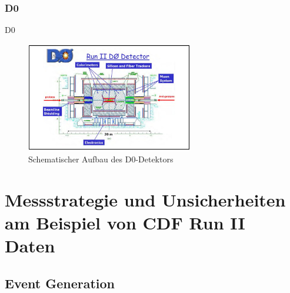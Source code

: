 \documentclass[aspectratio=1610, 9pt]{beamer}
\begin{document}
\subsubsection{D0}

\begin{frame}{D0}
  \begin{figure}
    \includegraphics[width=0.65\textwidth]{images/d0.jpg}
    \caption{Schematischer Aufbau des D0-Detektors \cite{D0}}
  \end{figure}
\end{frame}

\section{Messstrategie und Unsicherheiten am Beispiel von CDF Run II Daten}

\subsection{Event Generation}
\end{document}
